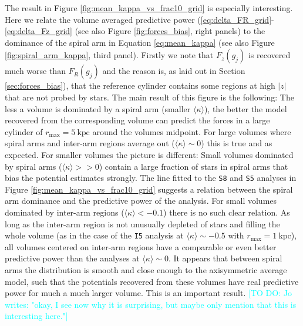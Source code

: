 \documentclass[iop,revtex4,numberedappendix,appendixfloats]{emulateapj}
\newcommand{\Jo}[1]{\textcolor{Cyan}{#1}}
\begin{document}
The result in Figure \ref{fig:mean_kappa_vs_frac10_grid} is especially interesting. Here we relate the volume averaged predictive power (\eqref{eq:delta_FR_grid}-\eqref{eq:delta_Fz_grid} (see also Figure \ref{fig:forces_bias}, right panels) to the dominance of the spiral arm in Equation \eqref{eq:mean_kappa} (see also Figure \ref{fig:spiral_arm_kappa}, third panel). Firstly we note that $F_z(g_j)$ is recovered much worse than $F_R(g_j)$ and the reason is, as laid out in Section \ref{sec:forces_bias}), that the reference cylinder contains some regions at high $|z|$ that are not probed by stars. The main result of this figure is the following: The less a volume is dominated by a spiral arm (smaller $\langle \kappa \rangle$), the better the model recovered from the corresponding volume can predict the forces in a large cylinder of $r_\text{max}=5~\text{kpc}$ around the volumes midpoint. For large volumes where spiral arms and inter-arm regions average out ($\langle \kappa \rangle \sim 0$) this is true and as expected. 
For smaller volumes the picture is different: 
Small volumes dominated by spiral arms ($\langle \kappa \rangle >> 0$)  contain a large fraction of stars in spiral arms that bias the potential estimates strongly. The line fitted to the \texttt{S8} and \texttt{S5} analyses in Figure \ref{fig:mean_kappa_vs_frac10_grid} suggests a relation between the spiral arm dominance and the predictive power of the analysis. 
For small volumes dominated by inter-arm regions ($\langle \kappa \rangle < -0.1$) there is no such clear relation. As long as the inter-arm region is not unusually depleted of stars and filling the whole volume (as in the case of the \texttt{I5} analysis at $\langle \kappa \rangle \sim -0.5$ with $r_\text{max}=1~\text{kpc}$), all volumes centered on inter-arm regions have a comparable or even better predictive power than the analyses at $\langle \kappa \rangle \sim 0$.  It appears that between spiral arms the distribution is smooth and close enough to the axisymmetric average model, such that the potentials recovered from these volumes have real predictive power for much a much larger volume. This is an important result. \Jo{[TO DO: Jo writes: "okay, I see now why it is surprising, but maybe only mention that this is interesting here."]}
\end{document}
